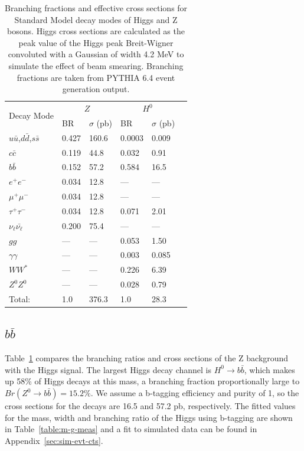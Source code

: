\documentclass[a4paper]{article}
\begin{document}
\begin{table}
	\begin{center}
		\begin{tabular}{|l|l|l|l|l|l|}
			\hline
			\multirow{2}{*}{Decay Mode} & \multicolumn{2}{|c|}{$Z$} & \multicolumn{2}{|c|}{$H^0$} \\ \cline{2-5}
			& BR & $\sigma$ (pb) & BR & $\sigma$ (pb) \\ 
			\hline
			$u\bar{u}$,$d\bar{d}$,$s\bar{s}$ & 0.427 & 160.6 & 0.0003 & 0.009 \\ \hline
			$c\bar{c}$      & 0.119 & 44.8 & 0.032 & 0.91 \\ \hline
			$b\bar{b}$      & 0.152 & 57.2 & 0.584 & 16.5 \\ \hline
			$e^+e^-$        & 0.034 & 12.8 & --- & --- \\ \hline
			$\mu^+\mu^-$    & 0.034 & 12.8 & --- & --- \\ \hline
			$\tau^+\tau^-$  & 0.034 & 12.8 & 0.071 & 2.01 \\ \hline
			$\nu_{\ell}\bar{\nu_{\ell}}$    & 0.200 & 75.4  & --- & --- \\ \hline
			$gg$                    & ---   & ---   & 0.053 & 1.50 \\ \hline
			$\gamma\gamma$  & ---   & ---   & 0.003 & 0.085 \\ \hline
			$WW^*$                  & ---   & ---   & 0.226 & 6.39 \\ \hline
			$Z^0Z^0$                & ---   & ---   & 0.028 & 0.79 \\
			\hline \hline
			Total:  & 1.0 & 376.3 & 1.0 & 28.3 \\ \hline
		\end{tabular}
	\end{center}
	\caption{Branching fractions and effective cross sections for Standard Model decay modes of Higgs and Z bosons. Higgs cross sections are calculated as the peak value of the Higgs peak Breit-Wigner convoluted with a Gaussian of width 4.2 MeV to simulate the effect of beam smearing. Branching fractions are taken from PYTHIA 6.4 event generation output.\label{bfs-xsects}}
\end{table}

	\subsection{$b\bar{b}$}
	Table~\ref{bfs-xsects} compares the branching ratios and cross sections of the Z background with the Higgs signal. The largest Higgs decay channel is $H^0\rightarrow b\bar{b}$, which makes up 58\% of Higgs decays at this mass, a branching fraction proportionally large to $Br(Z^0\rightarrow b\bar{b}) = 15.2\%$. We assume a b-tagging efficiency and purity of 1, so the cross sections for the decays are 16.5 and 57.2 pb, respectively. The fitted values for the mass, width and branching ratio of the Higgs using b-tagging are shown in Table~\ref{table:m-g-meas} and a fit to simulated data can be found in Appendix~\ref{sec:sim-evt-cts}.
\end{document}
